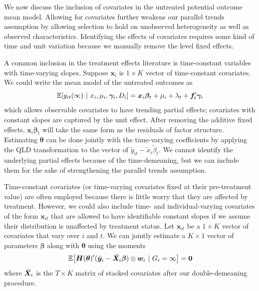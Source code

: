 \documentclass[12pt]{article}
\begin{document}
We now discuss the inclusion of covariates in the untreated potential outcome mean model. Allowing for covariates further weakens our parallel trends assumption by allowing selection to hold on unobserved heterogeneity as well as observed characteristics. Identifying the effects of covariates requires some kind of time and unit variation because we manually remove the level fixed effects. 

A common inclusion in the treatment effects literature is time-constant variables with time-varying slopes. Suppose $\bm x_i$ is $1 \times K$ vector of time-constant covariates. We could write the mean model of the untreated outcomes as 
\begin{equation}
    \E{y_{it}(\infty)}{x_i, \mu_i, \bm \gamma_i, D_i} = \bm x_i \bm \beta_t + \mu_i + \lambda_t + \bm f_t' \bm \gamma_i
\end{equation}
which allows observable covariates to have trending partial effects; covariates with constant slopes are captured by the unit effect. After removing the additive fixed effects, $\bm x_i \bm \beta_t$ will take the same form as the residuals of factor structure. Estimating $\bm \theta$ can be done jointly with the time-varying coefficients by applying the QLD transformation to the vector of $\tilde{y}_{it} - \tilde{x}_i \tilde{\beta}_t$. We cannot identify the underlying partial effects because of the time-demeaning, but we can include them for the sake of strengthening the parallel trends assumption.

Time-constant covariates (or time-varying covariates fixed at their pre-treatment value) are often employed because there is little worry that they are affected by treatment. However, we could also include time- and individual-varying covariates of the form $\bm x_{it}$ that are allowed to have identifiable constant slopes if we assume their distribution is unaffected by treatment status. Let $\bm x_{it}$ be a $1 \times K$ vector of covariates that vary over $i$ and $t$. We can jointly estimate a $K \times 1$ vector of parameters $\bm \beta$ along with $\bm \theta$ using the moments
\begin{equation}
    \E{\bm H(\bm \theta)' (\tilde{\bm y_i} - \tilde{\bm X_i} \bm \beta) \otimes \bm w_i}{G_i = \infty} = \bm 0
\end{equation}
where $\Tilde{\bm X}_i$ is the $T \times K$ matrix of stacked covariates after our double-demeaning procedure.
\end{document}
